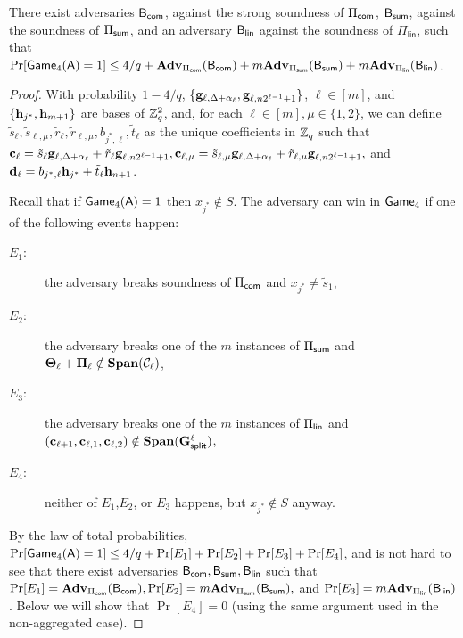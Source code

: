\begin{lemma}
There exist adversaries \(\mathsf{B}_{\mathsf{com}}\), against the strong soundness of \(\Pi_{\mathsf{com}}\), \(\mathsf{B}_{\mathsf{sum}}\), against the soundness of \(\Pi_{\mathsf{sum}}\), and an adversary \(\mathsf{B}_\mathsf{lin}\) against the soundness of \(\Pi_\mathsf{lin}\), such that \(\Pr[\mathsf{Game}_4(\mathsf{A})=1]\leq 4/q+ \mathbf{Adv}_{\Pi_{\mathsf{com}}}(\mathsf{B}_{\mathsf{com}})+m\mathbf{Adv}_{\Pi_{\mathsf{sum}}}(\mathsf{B}_{\mathsf{sum}})+m\mathbf{Adv}_{\Pi_\mathsf{lin}}(\mathsf{B}_\mathsf{lin})\).
\end{lemma}
\begin{proof}
With probability \(1-4/q\), \(\{\mathbf{g}_{\ell,\Delta+\alpha_\ell},\mathbf{g}_{\ell,n2^{\ell-1}+1}\}\), \(\ell\in [m]\), and \(\{\mathbf{h}_{j^*},\allowbreak \mathbf{h}_{m+1}\}\) are bases of \(\mathbb{Z}_q^2\),
and, for each \(\ell\in [m],\mu\in\{1,2\}\), we can define \(\tilde{s}_\ell,\tilde{s}_{\ell,\mu},\tilde{r}_\ell,\tilde{r}_{\ell,\mu},b_{j^*,\ell},\tilde{t}_\ell\) as the unique coefficients in \(\mathbb{Z}_q\) such that \(\mathbf{c}_\ell=\allowbreak \tilde{s}_\ell\mathbf{g}_{\ell,\Delta+\alpha_\ell} + \tilde{r}_\ell \mathbf{g}_{\ell,n2^{\ell-1}+1}, \mathbf{c}_{\ell,\mu}=\tilde{s}_{\ell,\mu}\mathbf{g}_{\ell,\Delta+\alpha_\ell} + \tilde{r}_{\ell,\mu} \mathbf{g}_{\ell,n2^{\ell-1}+1},\) and \(\mathbf{d}_\ell= b_{j^*,\ell} \mathbf{h}_{j^*} + \tilde{t}_\ell \mathbf{h}_{n+1}\).

Recall that if \(\mathsf{Game}_4(\mathsf{A})=1\) then \(x_{j^*}\notin S\). The adversary can win in \(\mathsf{Game}_4\) if one of the following events happen:
\begin{description}
\item[\(E_1\):] the adversary breaks soundness of \(\Pi_{\mathsf{com}}\) and \(x_{j^*}\neq \tilde{s}_1\),
\item[\(E_2\):] the adversary breaks one of the \(m\)  instances of \(\Pi_{\mathsf{sum}}\) and \(\mathbf{{\Theta}}_\ell+\mathbf{{\Pi}}_\ell\notin\mathbf{Span}(\mathcal{C}_\ell)\),
\item[\(E_3\):] the adversary breaks one of the \(m\) instances of \(\Pi_{\mathsf{lin}}\) and \((\mathbf{c}_{\ell+1},\mathbf{c}_{\ell,1},\mathbf{c}_{\ell,2})\notin\mathbf{Span}(\mathbf{{G}}_\mathsf{split}^\ell)\),
\item[\(E_4\):] neither of \(E_1\),\(E_2\), or \(E_3\) happens, but \(x_{j^*}\notin S\) anyway.
\end{description}
By the law of total probabilities, \(\Pr[\mathsf{Game}_4(\mathsf{A})=1]\leq 4/q+\Pr[E_1]+\Pr[E_2]+\Pr[E_3]+\Pr[E_4]\), and is not hard to see that there exist adversaries \(\mathsf{B}_{\mathsf{com}},\mathsf{B}_{\mathsf{sum}},\mathsf{B}_\mathsf{lin}\) such that \(\Pr[E_1]=\mathbf{Adv}_{\Pi_{\mathsf{com}}}(\mathsf{B}_{\mathsf{com}}),\Pr[E_2]=m\mathbf{Adv}_{\Pi_{\mathsf{sum}}}(\mathsf{B}_{\mathsf{sum}}),\) and \(\Pr[E_3]=m\mathbf{Adv}_{\Pi_\mathsf{lin}}(\mathsf{B}_\mathsf{lin})\). Below we will show that \(\Pr[E_4]=0\) (using the same argument used in the non-aggregated case).


\end{proof}

